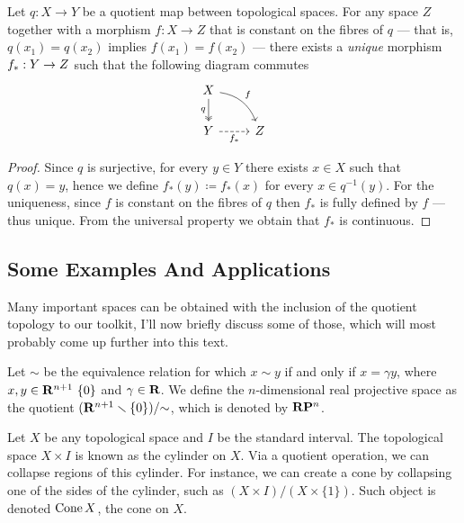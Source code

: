 \begin{theorem}
    \label{thm:Top-quotient-descent}
    Let \(q: X \to Y\) be a quotient map between topological spaces. For any space
    \(Z\) together with a morphism \(f: X \to Z\) that is constant on the fibres of
    \(q\) --- that is, \(q(x_1) = q(x_2)\) implies \(f(x_1) = f(x_2)\) --- there
    exists a \emph{unique} morphism \(f_{*}: Y \to Z\) such that the following
    diagram commutes
    \[
        \begin{tikzcd}
            X \ar[d, two heads, "q", swap] \ar[dr, bend left, "f"] & \\
            Y \ar[r, dashed, swap, "f_{*}"] &Z
        \end{tikzcd}
    \]
\end{theorem}

\begin{proof}
    Since \(q\) is surjective, for every \(y \in Y\) there exists \(x \in X\) such
    that \(q(x) = y\), hence we define \(f_{*}(y) \coloneq f_{*}(x)\) for every
    \(x \in q^{-1}(y)\). For the uniqueness, since \(f\) is constant on the fibres
    of \(q\) then \(f_{*}\) is fully defined by \(f\) --- thus unique. From the
    universal property we obtain that \(f_{*}\) is continuous.
\end{proof}

\subsection{Some Examples And Applications}

Many important spaces can be obtained with the inclusion of the quotient
topology to our toolkit, I'll now briefly discuss some of those, which will most
probably come up further into this text.

\begin{example}\label{exp:real-projective-space}
    Let \(\sim\) be the equivalence relation for which \(x \sim y\) if and only if
    \(x = \gamma y\), where \(x, y \in \mathbf{R}^{n+1} \ \{0\}\) and \(\gamma \in \mathbf{R}\). We
    define the \(n\)-dimensional real projective space as the quotient \((\mathbf{R}^{n+1}
    \smallsetminus \{0\})/{\sim}\), which is denoted by \(\mathbf{R} \mathbf{P}^{n}\).
\end{example}

\begin{definition}[Cone]\label{def:cone}
    Let \(X\) be any topological space and \(I\) be the standard interval. The
    topological space \(X \times I\) is known as the cylinder on \(X\). Via a
    quotient operation, we can collapse regions of this cylinder. For instance,
    we can create a cone by collapsing one of the sides of the cylinder, such as
    \((X \times I) / (X \times \{1\})\). Such object is denoted \(\operatorname{Cone} X\), the
    cone on \(X\).
\end{definition}

